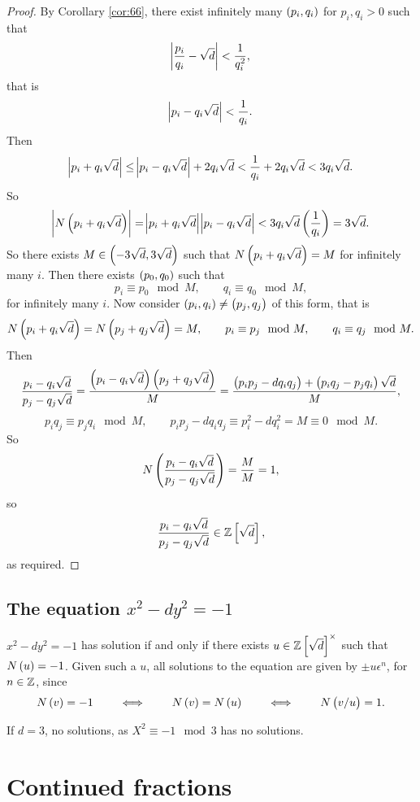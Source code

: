 \begin{proof}
By Corollary \ref{cor:66}, there exist infinitely many $ \br{p_i, q_i} $ for $ p_i, q_i > 0 $ such that
$$ \abs{\dfrac{p_i}{q_i} - \sqrt{d}} < \dfrac{1}{q_i^2}, $$
that is
$$ \abs{p_i - q_i\sqrt{d}} < \dfrac{1}{q_i}. $$
Then
$$ \abs{p_i + q_i\sqrt{d}} \le \abs{p_i - q_i\sqrt{d}} + 2q_i\sqrt{d} < \dfrac{1}{q_i} + 2q_i\sqrt{d} < 3q_i\sqrt{d}. $$
So
$$ \abs{N\br{p_i + q_i\sqrt{d}}} = \abs{p_i + q_i\sqrt{d}}\abs{p_i - q_i\sqrt{d}} < 3q_i\sqrt{d}\br{\dfrac{1}{q_i}} = 3\sqrt{d}. $$
So there exists $ M \in \br{-3\sqrt{d}, 3\sqrt{d}} $ such that $ N\br{p_i + q_i\sqrt{d}} = M $ for infinitely many $ i $. Then there exists $ \br{p_0, q_0} $ such that
$$ p_i \equiv p_0 \mod M, \qquad q_i \equiv q_0 \mod M, $$
for infinitely many $ i $. Now consider $ \br{p_i, q_i} \ne \br{p_j, q_j} $ of this form, that is
$$ N\br{p_i + q_i\sqrt{d}} = N\br{p_j + q_j\sqrt{d}} = M, \qquad p_i \equiv p_j \mod M, \qquad q_i \equiv q_j \mod M. $$
Then
$$ \dfrac{p_i - q_i\sqrt{d}}{p_j - q_j\sqrt{d}} = \dfrac{\br{p_i - q_i\sqrt{d}}\br{p_j + q_j\sqrt{d}}}{M} = \dfrac{\br{p_ip_j - dq_iq_j} + \br{p_iq_j - p_jq_i}\sqrt{d}}{M}, $$
$$ p_iq_j \equiv p_jq_i \mod M, \qquad p_ip_j - dq_iq_j \equiv p_i^2 - dq_i^2 = M \equiv 0 \mod M. $$
So
$$ N\br{\dfrac{p_i - q_i\sqrt{d}}{p_j - q_j\sqrt{d}}} = \dfrac{M}{M} = 1, $$
so
$$ \dfrac{p_i - q_i\sqrt{d}}{p_j - q_j\sqrt{d}} \in \Z\sbr{\sqrt{d}}, $$
as required.
\end{proof}


\subsection{The equation $ x^2 - dy^2 = - 1 $}

$ x^2 - dy^2 = -1 $ has solution if and only if there exists $ u \in \Z\sbr{\sqrt{d}}^\times $ such that $ N\br{u} = -1 $. Given such a $ u $, all solutions to the equation are given by $ \pm u\epsilon^n $, for $ n \in \mathbb{Z} $, since
$$ N\br{v} = -1 \qquad \iff \qquad N\br{v} = N\br{u} \qquad \iff \qquad N\br{v / u} = 1. $$

\begin{example*}
If $ d = 3 $, no solutions, as $ X^2 \equiv -1 \mod 3 $ has no solutions.
\end{example*}

\pagebreak

\section{Continued fractions}

